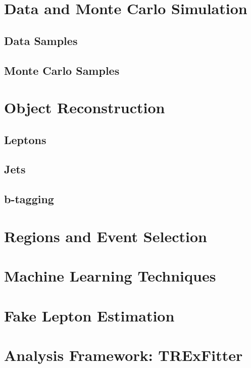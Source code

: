 
\section{Data and Monte Carlo Simulation}
\subsection{Data Samples}
\subsection{Monte Carlo Samples}
\section{Object Reconstruction}
\subsection{Leptons}
\subsection{Jets}
\subsection{b-tagging}
\section{Regions and Event Selection}
\section{Machine Learning Techniques}
\section{Fake Lepton Estimation} 
\section{Analysis Framework: TRExFitter}